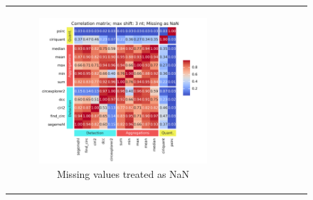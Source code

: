 \begin{figure}[ht] \begin{tabular}{cc} \begin{subfigure}{0.5\textwidth}
            \centering

            \includegraphics[width=\linewidth]{chapters/4_results_and_discussion/figures/quantification/correlation_heatmap_3_na.png}
            \caption{Missing values treated as NaN}
            \label{fig:correlation_heatmap_3_na}
        \end{subfigure} & \begin{subfigure}{0.5\textwidth} \centering


\end{subfigure}
\end{tabular}
\end{figure}
